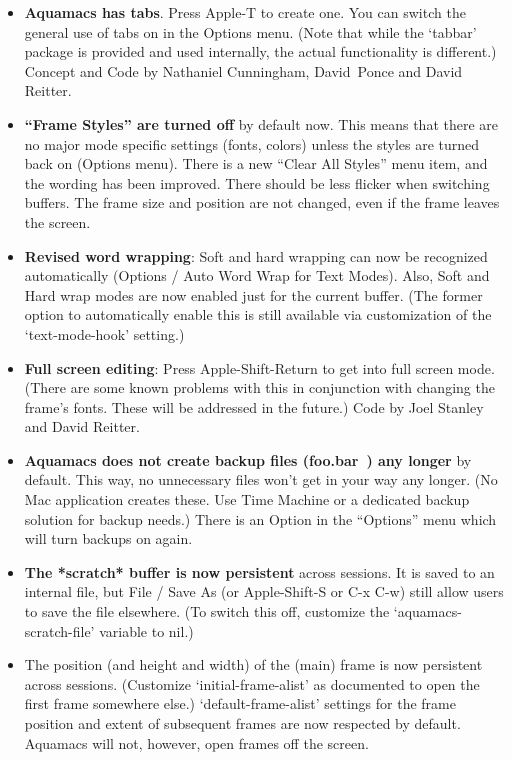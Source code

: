 \begin{itemize}

\item \textbf{Aquamacs has tabs}. Press Apple-T to create one. You can switch the general use of tabs on in the Options menu. (Note that while the `tabbar' package is provided and used internally, the actual functionality is different.)
Concept and Code by Nathaniel Cunningham, David~Ponce and David Reitter.


\item \textbf{``Frame Styles'' are turned off} by default now. This means that there are no major mode specific settings (fonts, colors)  unless the styles are turned back on (Options menu).   There is a  new ``Clear All Styles'' menu item, and the wording has been improved. There should be less flicker when  switching buffers. The frame size and position are not changed,  even if the frame leaves the screen.

\item \textbf{Revised word wrapping}: Soft and hard wrapping can now be recognized automatically (Options / Auto Word Wrap for Text Modes). Also, Soft and Hard wrap modes are now enabled just for the current buffer.  (The former option to automatically enable this is still available via customization of the `text-mode-hook' setting.)

\item \textbf{Full screen editing}: Press Apple-Shift-Return to get into full screen mode. (There are some known problems with this in  conjunction with changing the frame's fonts. These will be addressed  in the future.)
Code by Joel Stanley and David Reitter.

\item \textbf{Aquamacs does not create backup files (foo.bar~) any longer} by default. This way, no unnecessary files won't get in your way any longer. (No Mac application creates these. Use Time Machine or a dedicated backup solution for backup needs.) There is an Option in the ``Options'' menu which will turn backups on again.

\item \textbf{The *scratch* buffer is now persistent} across sessions.
  It is saved to an internal file, but File / Save As  (or
  Apple-Shift-S or C-x C-w) still allow users to save the file elsewhere.
(To switch this off, customize the `aquamacs-scratch-file' variable to nil.)

\item The position (and height and width) of the (main) frame is now persistent across sessions.  (Customize `initial-frame-alist' as documented to open the first frame somewhere else.)  `default-frame-alist' settings for the frame position and extent of subsequent frames are now respected by default.  Aquamacs will not, however, open frames off the screen.


\end{itemize}
